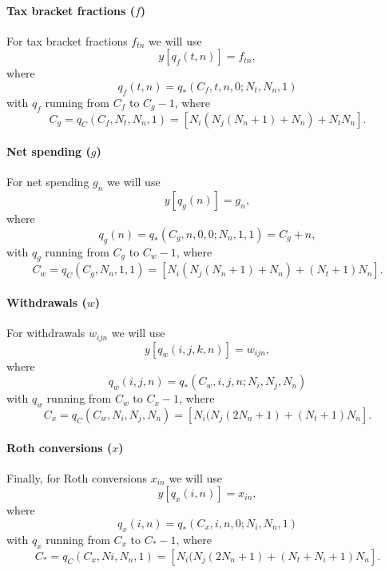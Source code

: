 \documentclass{report}[fleqn,12pt]
\begin{document}
\paragraph*{Tax bracket fractions (\boldmath$f$)}
For tax bracket fractions $f_{t n}$ we will use
\begin{equation}
	y[q_f(t, n)] = f_{t n},
\end{equation}
where
\begin{equation}
	q_f(t, n) = q_*(C_f, t, n, 0; N_t, N_n, 1)
\end{equation}
with $q_f$ running from $C_f$ to $C_g - 1$, where
\[
	C_g = q_C(C_f, N_t, N_n, 1) = [N_i(N_j(N_n+1) + N_n) + N_tN_n].
\]

\paragraph*{Net spending (\boldmath$g$)}
For net spending $g_{n}$ we will use
\begin{equation}
	y[q_g(n)] = g_{n},
\end{equation}
where
\begin{equation}
	q_g(n) = q_*(C_g, n, 0, 0; N_n, 1, 1) = C_g + n,
\end{equation}
with $q_g$ running from $C_g$ to $C_w - 1$, where
\[
	C_w = q_C(C_g, N_n, 1, 1) = [N_i(N_j(N_n+1) + N_n) + (N_t + 1) N_n].
\]

\paragraph*{Withdrawals (\boldmath$w$)}
For withdrawals $w_{ijn}$ we will use
\begin{equation}
	y[q_w(i, j, k, n)] = w_{i j n},
\end{equation}
where
\begin{equation}
	q_w(i, j, n) = q_*(C_w, i, j, n; N_i, N_j, N_n)
\end{equation}
with $q_w$ running from $C_w$ to $C_x - 1$, where
\[
	C_x = q_C(C_w, N_i, N_j, N_n) = [N_i(N_j(2N_n + 1) + (N_t + 1) N_n].
\]

\paragraph*{Roth conversions (\boldmath$x$)}
Finally, for Roth conversions $x_{in}$ we will use
\begin{equation}
	y[q_x(i, n)] = x_{i n},
\end{equation}
where
\begin{equation}
	q_x(i, n) = q_*(C_x, i, n, 0; N_i, N_n, 1)
\end{equation}
with $q_x$ running from $C_x$ to $C_* - 1$, where
\[
	C_* = q_C(C_x, Ni, N_n, 1) = [N_i(N_j(2N_n + 1) + (N_t + N_i + 1) N_n].
\]
\end{document}
